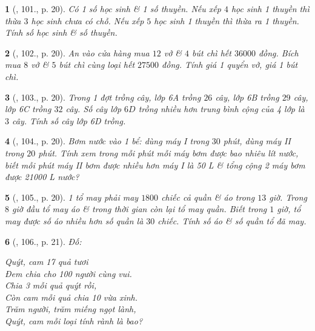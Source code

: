 \documentclass{article}
\newtheorem{baitoan}{}
\begin{document}
\begin{baitoan}[\cite{Binh_Toan_6_tap_1}, 101., p. 20]
	Có 1 số học sinh \& 1 số thuyền. Nếu xếp $4$ học sinh 1 thuyền thì thừa $3$ học sinh chưa có chỗ. Nếu xếp $5$ học sinh 1 thuyền thì thừa ra 1 thuyền. Tính số học sinh \& số thuyền.
\end{baitoan}

\begin{baitoan}[\cite{Binh_Toan_6_tap_1}, 102., p. 20]
	An vào cửa hàng mua $12$ vở \& $4$ bút chì hết $36000$ đồng. Bích mua $8$ vở \& $5$ bút chì cùng loại hết $27500$ đồng. Tính giá 1 quyển vở, giá 1 bút chì.
\end{baitoan}

\begin{baitoan}[\cite{Binh_Toan_6_tap_1}, 103., p. 20]
	Trong 1 đợt trồng cây, lớp 6A trồng $26$ cây, lớp 6B trồng $29$ cây, lớp 6C trồng $32$ cây. Số cây lớp $6D$ trồng nhiều hơn trung bình cộng của 4 lớp là $3$ cây. Tính số cây lớp 6D trồng.
\end{baitoan}

\begin{baitoan}[\cite{Binh_Toan_6_tap_1}, 104., p. 20]
	Bơm nước vào 1 bể: dùng máy {\rm I} trong $30$ phút, dùng máy {\rm II} trong $20$ phút. Tính xem trong mỗi phút mỗi máy bơm được bao nhiêu lít nước, biết mỗi phút máy {\rm II} bơm được nhiều hơn máy {\rm I} là {\rm50 L} \& tổng cộng 2 máy bơm được {\rm21000 L} nước?
\end{baitoan}

\begin{baitoan}[\cite{Binh_Toan_6_tap_1}, 105., p. 20]
	1 tổ may phải may $1800$ chiếc cả quần \& áo trong $13$ giờ. Trong $8$ giờ đầu tổ may áo \& trong thời gian còn lại tổ may quần. Biết trong $1$ giờ, tổ may được số áo nhiều hơn số quần là $30$ chiếc. Tính số áo \& số quần tổ đã may.
\end{baitoan}

\begin{baitoan}[\cite{Binh_Toan_6_tap_1}, 106., p. 21]
	Đố:
	\begin{center}
		Quýt, cam 17 quả tươi\\Đem chia cho 100 người cùng vui.\\Chia 3 mỗi quả quýt rồi,\\Còn cam mỗi quả chia 10 vừa xinh.\\Trăm người, trăm miếng ngọt lành,\\Quýt, cam mỗi loại tính rành là bao?
	\end{center}
\end{baitoan}
\end{document}
